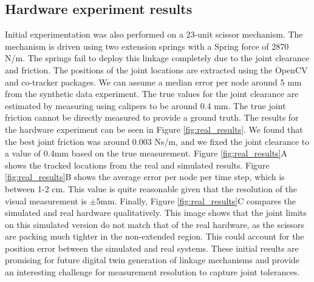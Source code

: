 \subsection{Hardware experiment results}
Initial experimentation was also performed on a 23-unit scissor mechanism. The mechanism is driven using two extension springs with a Spring force of 2870 N/m. The springs fail to deploy this linkage completely due to the joint clearance and friction. The positions of the joint locations are extracted using the OpenCV and co-tracker packages. We can assume a median error per node around 5 mm from the synthetic data experiment. The true values for the joint clearance are estimated by measuring using calipers to be around 0.4 mm. The true joint friction cannot be directly measured to provide a ground truth. The results for the hardware experiment can be seen in Figure \ref{fig:real_results}. We found that the best joint friction was around 0.003 Ns/m, and we fixed the joint clearance to a value of 0.4mm based on the true measurement. Figure \ref{fig:real_results}A shows the tracked locations from the real and simulated results. Figure \ref{fig:real_results}B shows the average error per node per time step, which is between 1-2 cm. This value is quite reasonable given that the resolution of the visual measurement is $\pm$5mm. Finally, Figure \ref{fig:real_results}C compares the simulated and real hardware qualitatively. This image shows that the joint limits on this simulated version do not match that of the real hardware, as the scissors are packing much tighter in the non-extended region. This could account for the position error between the simulated and real systems. These initial results are promising for future digital twin generation of linkage mechanisms and provide an interesting challenge for measurement resolution to capture joint tolerances. 

